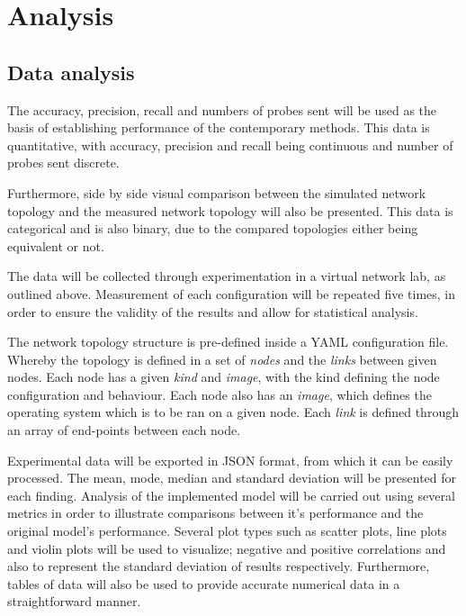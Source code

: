 \section{Analysis}



\subsection{Data analysis}

The accuracy, precision, recall and numbers of probes sent will be used as the basis of establishing performance of the contemporary methods. This data is quantitative, with accuracy, precision and recall being continuous and number of probes sent discrete. 

Furthermore, side by side visual comparison between the simulated network topology and the measured network topology will also be presented. This data is categorical and is also binary, due to the compared topologies either being equivalent or not. 

The data will be collected through experimentation in a virtual network lab, as outlined above. Measurement of each configuration will be repeated five times, in order to ensure the validity of the results and allow for statistical analysis. 

The network topology structure is pre-defined inside a YAML configuration file. Whereby the topology is defined in a set of \textit{nodes} and the \textit{links} between given nodes. Each node has a given \textit{kind} and \textit{image}, with the kind defining the node configuration and behaviour. Each node also has an \textit{image}, which defines the operating system which is to be ran on a given node. Each \textit{link} is defined through an array of end-points between each node. 

Experimental data will be exported in JSON format, from which it can be easily processed. The mean, mode, median and standard deviation will be presented for each finding. Analysis of the implemented model will be carried out using several metrics in order to illustrate comparisons between it's performance and the original model's performance. Several plot types such as scatter plots, line plots and violin plots will be used to visualize; negative and positive correlations and also to represent the standard deviation of results respectively. Furthermore, tables of data will also be used to provide accurate numerical data in a straightforward manner.

